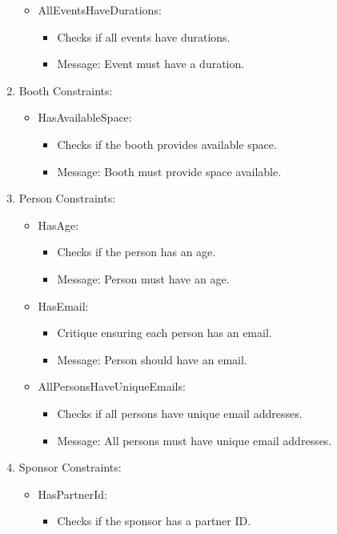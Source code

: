 \documentclass[a4paper,11pt]{report}
\begin{document}
\begin{enumerate}
\begin{itemize}
\begin{itemize}
		\end{itemize}
		\item AllEventsHaveDurations:
		\begin{itemize}
			\item Checks if all events have durations.
			\item Message: Event must have a duration.
		\end{itemize}
	\end{itemize}
	\item Booth Constraints:
		\begin{itemize}
			\item HasAvailableSpace:
			\begin{itemize}
				\item Checks if the booth provides available space.
				\item Message: Booth must provide space available.
			\end{itemize}
		\end{itemize}
	\item Person Constraints:
		\begin{itemize}
			\item HasAge:
			\begin{itemize}
				\item Checks if the person has an age.
				\item Message: Person must have an age.
			\end{itemize}
			\item HasEmail:
			\begin{itemize}
				\item Critique ensuring each person has an email.
				\item Message: Person should have an email.
			\end{itemize}
			\item AllPersonsHaveUniqueEmails:
			\begin{itemize}
				\item Checks if all persons have unique email addresses.
				\item Message: All persons must have unique email addresses.
			\end{itemize}
		\end{itemize}
	\item Sponsor Constraints:
	\begin{itemize}
		\item HasPartnerId:
		\begin{itemize}
			\item Checks if the sponsor has a partner ID.

\end{itemize}
\end{itemize}
\end{enumerate}
\end{document}
